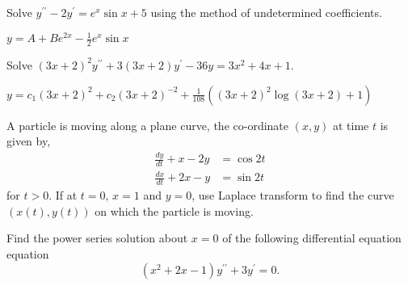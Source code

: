 \documentclass[a4paper,12pt]{vitexam}
\begin{document}
\begin{questions}
     

\question[10] 
Solve $y^{\prime\prime} - 2y^\prime = e^x \sin x + 5$ using the method of undetermined coefficients.

\begin{solution}
$y = A + B e^{2x} - \frac 1 2 e^x \sin x$
\end{solution} 

     

\question[10]  Solve $(3x+2)^2 y ^{\prime \prime } + 3 ( 3x + 2) y^\prime -36 y = 3x^2 + 4x +1. $
\begin{solution}
	$ y = c_1 (3x+2)^2 + c_2 (3x + 2)^{-2} + \frac 1 {108} \left( (3x+2)^2 \log (3x+2) +1 \right)$
\end{solution}




     

\question[10] A particle is moving along a plane curve,  the co-ordinate $(x,y)$ at time $t$ is given by,
\begin{align*}
	\frac{dy}{dt} + x - 2y  & = \cos 2t \\
	\frac{dx}{dt} + 2x - y & = \sin 2t			 
\end{align*}
for $t > 0$. If at $t = 0$, $x =1$ and $y = 0$, use Laplace transform to find the curve $(x(t),y(t))$ on which the particle is moving. 




     

\question[10] Find the power series solution about $x=0$ of the following differential equation equation $$(x^2 + 2x -1)y^{\prime\prime} + 3y^{\prime}= 0.$$

     

\question
{}


\end{questions}
\end{document}
